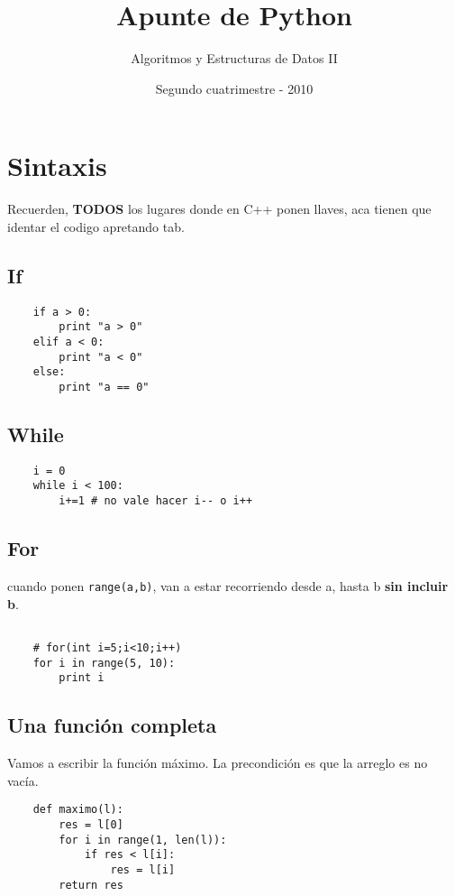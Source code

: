 \documentclass[a4paper, twocolumn]{article}
\title{Apunte de Python}
\author{Algoritmos y Estructuras de Datos II}
\date{Segundo cuatrimestre - 2010}
\begin{document}
\maketitle


\pagestyle{myheadings} \thispagestyle{plain}



\section{Sintaxis}
Recuerden, \textbf{TODOS} los lugares donde en C++ ponen llaves, aca tienen que identar el codigo apretando tab.
\subsection{If}
\begin{verbatim}
    if a > 0:
        print "a > 0"
    elif a < 0:
        print "a < 0"
    else:
        print "a == 0"
\end{verbatim}

\subsection{While}

\begin{verbatim}
    i = 0
    while i < 100:
        i+=1 # no vale hacer i-- o i++
\end{verbatim}

\subsection{For}
cuando ponen \texttt{range(a,b)}, van a estar recorriendo desde a, hasta b \textbf{sin incluir b}.
\begin{verbatim}

    # for(int i=5;i<10;i++)
    for i in range(5, 10): 
        print i

\end{verbatim}

\subsection{Una función completa}
Vamos a escribir la función máximo. La precondición es que la arreglo es no vacía.
\begin{verbatim}
    def maximo(l):
        res = l[0]
        for i in range(1, len(l)):
            if res < l[i]: 
                res = l[i]
        return res                
\end{verbatim}
\end{document}
